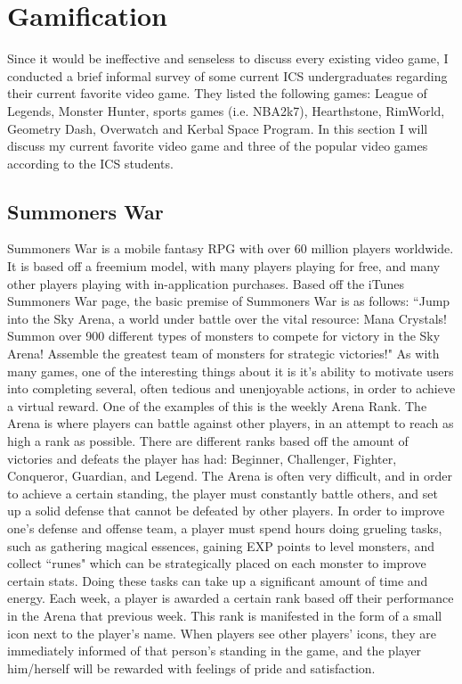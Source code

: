 \section{Gamification}
Since it would be ineffective and senseless to discuss every existing video game, I conducted a brief informal survey of some current ICS undergraduates regarding their current favorite video game. They listed the following games: League of Legends, Monster Hunter, sports games (i.e. NBA2k7), Hearthstone, RimWorld, Geometry Dash, Overwatch and Kerbal Space Program. In this section I will discuss my current favorite video game and three of the popular video games according to the ICS students.
\subsection{Summoners War}
Summoners War is a mobile fantasy RPG with over 60 million players worldwide. It is based off a freemium model, with many players playing for free, and many other players playing with in-application purchases. Based off the iTunes Summoners War page, the basic premise of Summoners War is as follows: ``Jump into the Sky Arena, a world under battle over the vital resource: Mana Crystals! Summon over 900 different types of monsters to compete for victory in the Sky Arena! Assemble the greatest team of monsters for strategic victories!"
	As with many games, one of the interesting things about it is it's ability to motivate users into completing several, often tedious and unenjoyable actions, in order to achieve a virtual reward. One of the examples of this is the weekly Arena Rank. The Arena is where players can battle against other players, in an attempt to reach as high a rank as possible. There are different ranks based off the amount of victories and defeats the player has had: Beginner, Challenger, Fighter, Conqueror, Guardian, and Legend. The Arena is often very difficult, and in order to achieve a certain standing, the player must constantly battle others, and set up a solid defense that cannot be defeated by other players. In order to improve one's defense and offense team, a player must spend hours doing grueling tasks, such as gathering magical essences, gaining EXP points to level monsters, and collect ``runes" which can be strategically placed on each monster to improve certain stats. Doing these tasks can take up a significant amount of time and energy. Each week, a player is awarded a certain rank based off their performance in the Arena that previous week. This rank is manifested in the form of a small icon next to the player's name. When players see other players' icons, they are immediately informed of that person's standing in the game, and the player him/herself will be rewarded with feelings of pride and satisfaction.

